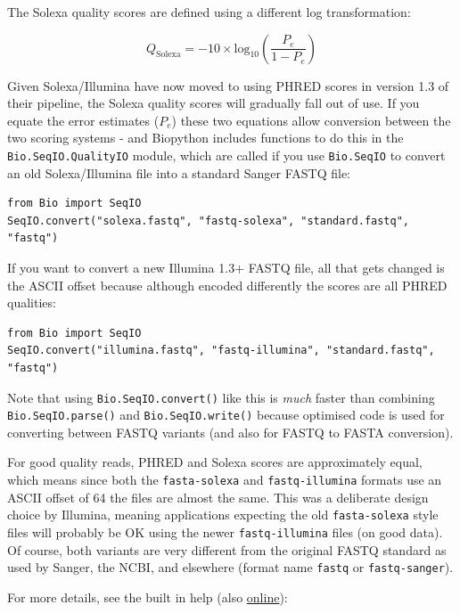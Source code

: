\documentclass{report}
\begin{document}
The Solexa quality scores are defined using a different log transformation:

\begin{equation}
Q_{\textrm{Solexa}} = - 10 \times \textrm{log}_{10} \left( \frac{P_e}{1-P_e} \right)
\end{equation}

Given Solexa/Illumina have now moved to using PHRED scores in version 1.3 of
their pipeline, the Solexa quality scores will gradually fall out of use.
If you equate the error estimates ($P_e$) these two equations allow conversion
between the two scoring systems - and Biopython includes functions to do this
in the \verb|Bio.SeqIO.QualityIO| module, which are called if you use
\verb|Bio.SeqIO| to convert an old Solexa/Illumina file into a standard Sanger
FASTQ file:

\begin{verbatim}
from Bio import SeqIO
SeqIO.convert("solexa.fastq", "fastq-solexa", "standard.fastq", "fastq")
\end{verbatim}

If you want to convert a new Illumina 1.3+ FASTQ file, all that gets changed
is the ASCII offset because although encoded differently the scores are all
PHRED qualities:

\begin{verbatim}
from Bio import SeqIO
SeqIO.convert("illumina.fastq", "fastq-illumina", "standard.fastq", "fastq")
\end{verbatim}

Note that using \verb|Bio.SeqIO.convert()| like this is \emph{much} faster
than combining \verb|Bio.SeqIO.parse()| and \verb|Bio.SeqIO.write()|
because optimised code is used for converting between FASTQ variants
(and also for FASTQ to FASTA conversion).

For good quality reads, PHRED and Solexa scores are approximately equal,
which means since both the \texttt{fasta-solexa} and \texttt{fastq-illumina}
formats use an ASCII offset of 64 the files are almost the same. This was a
deliberate design choice by Illumina, meaning applications expecting the old
\texttt{fasta-solexa} style files will probably be OK using the newer
\texttt{fastq-illumina} files (on good data). Of course, both variants are
very different from the original FASTQ standard as used by Sanger,
the NCBI, and elsewhere (format name \texttt{fastq} or \texttt{fastq-sanger}).

For more details, see the built in help (also \href{http://www.biopython.org/DIST/docs/api/Bio.SeqIO.QualityIO-module.html}{online}):
\end{document}
